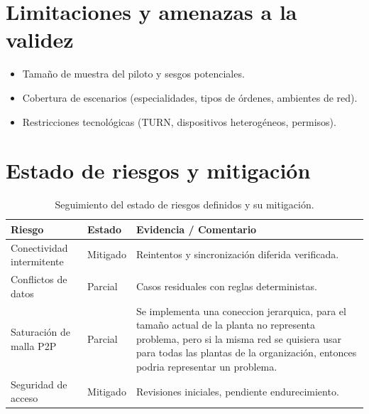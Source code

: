 \documentclass[10pt,a4paper]{report}
\begin{document}
\section*{Limitaciones y amenazas a la validez}
\begin{itemize}
    \item Tama\~no de muestra del piloto y sesgos potenciales.
    \item Cobertura de escenarios (especialidades, tipos de órdenes, ambientes de red).
    \item Restricciones tecnol\'ogicas (TURN, dispositivos heterog\'eneos, permisos).
\end{itemize}

\section*{Estado de riesgos y mitigaci\'on}
\begin{table}[H]
    \centering
    \begin{tabular}{p{5cm} p{3cm} p{7cm}}
        \hline
        \textbf{Riesgo} & \textbf{Estado} & \textbf{Evidencia / Comentario} \\
        \hline
        Conectividad intermitente & Mitigado & Reintentos y sincronizaci\'on diferida verificada. \\
        Conflictos de datos & Parcial & Casos residuales con reglas deterministas. \\
        Saturaci\'on de malla P2P & Parcial & Se implementa una coneccion jerarquica, para el tamaño actual de la planta no representa problema, pero si la misma red se quisiera usar para todas las plantas de la organización, entonces podria representar un problema. \\
        Seguridad de acceso & Mitigado & Revisiones iniciales, pendiente endurecimiento. \\
        \hline
    \end{tabular}
    \caption{Seguimiento del estado de riesgos definidos y su mitigaci\'on.}
    \label{tab:riesgos-estado}
\end{table}
\end{document}
